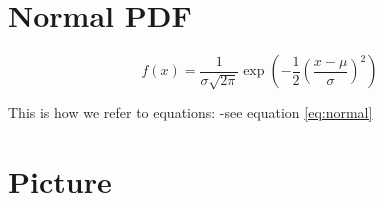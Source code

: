 \documentclass[
]{book}
\begin{document}
\hypertarget{normal-pdf}{%
\section{Normal PDF}\label{normal-pdf}}

\begin{equation} 
f(x) = \frac{1}{\sigma\sqrt{2\pi}}\exp\left(-\frac{1}{2}\left(\frac{x-\mu}{\sigma}\right)^{2}\right)
\label{eq:normal}
\end{equation}

This is how we refer to equations:
-see equation \eqref{eq:normal}

\hypertarget{picture}{%
\section{Picture}\label{picture}}
\end{document}
